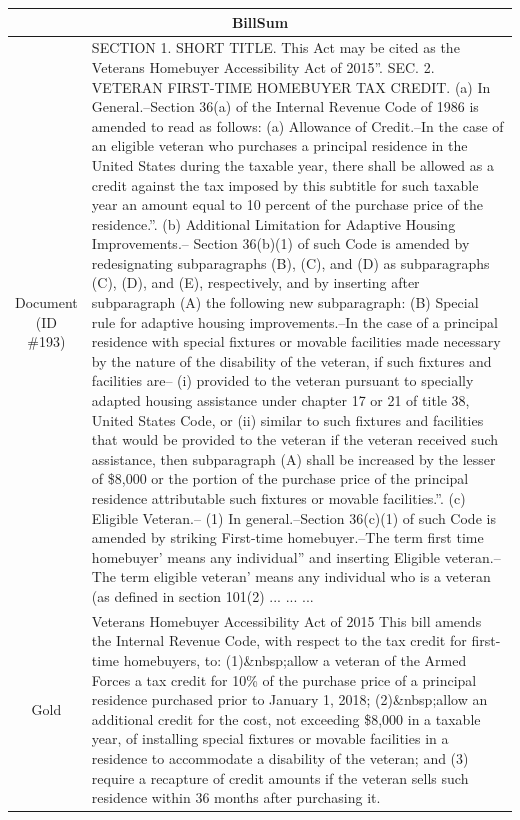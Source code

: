 \begin{table}[bth!]
\scriptsize
\centering
\renewcommand{\arraystretch}{1.3}
\begin{tabular}{c|p{}}
\hline
\multicolumn{2}{c}{BillSum} \\ \hline
\makecell{Document\\(ID \#193)} & 
SECTION 1. SHORT TITLE. This Act may be cited as the   Veterans Homebuyer Accessibility Act of 2015''. SEC. 2. VETERAN FIRST-TIME HOMEBUYER TAX CREDIT. (a) In General.--Section 36(a) of the Internal Revenue Code of 1986 is amended to read as follows:   (a) Allowance of Credit.--In the case of an eligible veteran who purchases a principal residence in the United States during the taxable year, there shall be allowed as a credit against the tax imposed by this subtitle for such taxable year an amount equal to 10 percent of the purchase price of the residence.''. (b) Additional Limitation for Adaptive Housing Improvements.-- Section 36(b)(1) of such Code is amended by redesignating subparagraphs (B), (C), and (D) as subparagraphs (C), (D), and (E), respectively, and by inserting after subparagraph (A) the following new subparagraph:   (B) Special rule for adaptive housing improvements.--In the case of a principal residence with special fixtures or movable facilities made necessary by the nature of the disability of the veteran, if such fixtures and facilities are--   (i) provided to the veteran pursuant to specially adapted housing assistance under chapter 17 or 21 of title 38, United States Code, or   (ii) similar to such fixtures and facilities that would be provided to the veteran if the veteran received such assistance, then subparagraph (A) shall be increased by the lesser of \$8,000 or the portion of the purchase price of the principal residence attributable such fixtures or movable facilities.''. (c) Eligible Veteran.-- (1) In general.--Section 36(c)(1) of such Code is amended by striking   First-time homebuyer.--The term   first time homebuyer' means any individual'' and inserting   Eligible veteran.--The term   eligible veteran' means any individual who is a veteran (as defined in section 101(2) ... ... ... 
\\ \hline
Gold & 
Veterans Homebuyer Accessibility Act of 2015 This bill amends the Internal Revenue Code, with respect to the tax credit for first-time homebuyers, to: (1)\&nbsp;allow a veteran of the Armed Forces a tax credit for 10\% of the purchase price of a principal residence purchased prior to January 1, 2018; (2)\&nbsp;allow an additional credit for the cost, not exceeding \$8,000 in a taxable year, of installing special fixtures or movable facilities in a residence to accommodate a disability of the veteran; and (3) require a recapture of credit amounts if the veteran sells such residence within 36 months after purchasing it.

\end{tabular}
\end{table}
